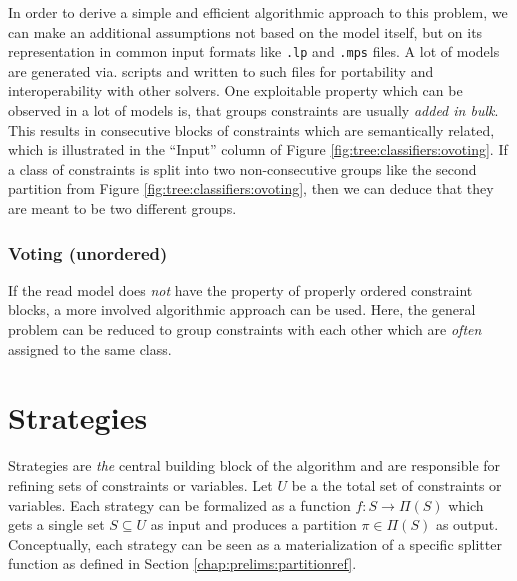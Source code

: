 				In order to derive a simple and efficient algorithmic approach to this problem, we can make an additional assumptions not based on the model itself, but on its representation in common input formats like \lstinline|.lp| and \lstinline|.mps| files.
				A lot of models are generated via. scripts and written to such files for portability and interoperability with other solvers.
				One exploitable property which can be observed in a lot of models is, that groups constraints are usually \textit{added in bulk}.
				This results in consecutive blocks of constraints which are semantically related, which is illustrated in the \enquote{Input} column of Figure \ref{fig:tree:classifiers:ovoting}.
				If a class of constraints is split into two non-consecutive groups like the second partition from Figure \ref{fig:tree:classifiers:ovoting}, then we can deduce that they are meant to be two different groups.
			
			\subsubsection{Voting (unordered)}
			\label{chap:tree:classifiers:cooccurence}
			
				If the read model does \textit{not} have the property of properly ordered constraint blocks, a more involved algorithmic approach can be used.
				Here, the general problem can be reduced to group constraints with each other which are \textit{often} assigned to the same class. 
					
				\clearpage
		
%	
%			
		
	\section{Strategies}
	\label{chap:tree:strategies}
	
		Strategies are \textit{the} central building block of the algorithm and are responsible for refining sets of constraints or variables.
		Let $U$ be a the total set of constraints or variables.
		Each strategy can be formalized as a function $f: S \rightarrow \Pi(S)$ which gets a single set $S \subseteq U$ as input and produces a partition $\pi \in \Pi(S)$ as output.
		Conceptually, each strategy can be seen as a materialization of a specific splitter function as defined in Section \ref{chap:prelims:partitionref}.
		
